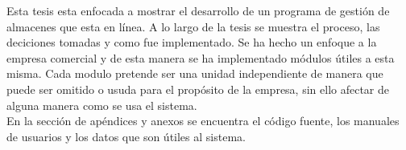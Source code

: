 


\begin{abstracts}        %

Esta tesis esta enfocada a mostrar el desarrollo de un programa de gestión de almacenes que esta en línea. A lo largo de la tesis se muestra el proceso, las deciciones tomadas y como fue implementado. Se ha hecho un enfoque a la empresa comercial y de esta manera se ha implementado módulos útiles a esta misma. Cada modulo pretende ser una unidad independiente de manera que puede ser omitido o usuda para el propósito de la empresa, sin ello afectar de alguna manera como se usa el sistema.\\

En la sección de apéndices y anexos se encuentra el código fuente, los manuales de usuarios y los datos que son útiles al sistema.

\end{abstracts}


